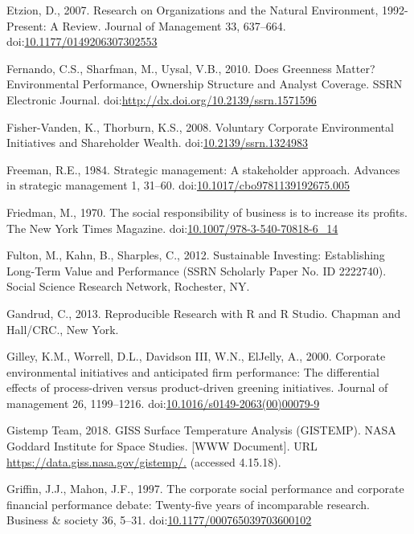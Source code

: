 \documentclass[12pt,]{article}
\begin{document}
\hypertarget{ref-Etzion2007}{}
Etzion, D., 2007. Research on Organizations and the Natural Environment,
1992-Present: A Review. Journal of Management 33, 637--664.
doi:\href{https://doi.org/10.1177/0149206307302553}{10.1177/0149206307302553}

\hypertarget{ref-Fernando2010}{}
Fernando, C.S., Sharfman, M., Uysal, V.B., 2010. Does Greenness Matter?
Environmental Performance, Ownership Structure and Analyst Coverage.
SSRN Electronic Journal.
doi:\href{https://doi.org/http://dx.doi.org/10.2139/ssrn.1571596}{http://dx.doi.org/10.2139/ssrn.1571596}

\hypertarget{ref-Fisher-Vanden2008}{}
Fisher-Vanden, K., Thorburn, K.S., 2008. Voluntary Corporate
Environmental Initiatives and Shareholder Wealth.
doi:\href{https://doi.org/10.2139/ssrn.1324983}{10.2139/ssrn.1324983}

\hypertarget{ref-Freeman1984}{}
Freeman, R.E., 1984. Strategic management: A stakeholder approach.
Advances in strategic management 1, 31--60.
doi:\href{https://doi.org/10.1017/cbo9781139192675.005}{10.1017/cbo9781139192675.005}

\hypertarget{ref-MiltonFriedman1970}{}
Friedman, M., 1970. The social responsibility of business is to increase
its profits. The New York Times Magazine.
doi:\href{https://doi.org/10.1007/978-3-540-70818-6_14}{10.1007/978-3-540-70818-6\_14}

\hypertarget{ref-Fulton2012}{}
Fulton, M., Kahn, B., Sharples, C., 2012. Sustainable Investing:
Establishing Long-Term Value and Performance (SSRN Scholarly Paper No.
ID 2222740). Social Science Research Network, Rochester, NY.

\hypertarget{ref-Gandrud2013b}{}
Gandrud, C., 2013. Reproducible Research with R and R Studio. Chapman
and Hall/CRC., New York.

\hypertarget{ref-Gilley2000}{}
Gilley, K.M., Worrell, D.L., Davidson III, W.N., El\textendash{}Jelly,
A., 2000. Corporate environmental initiatives and anticipated firm
performance: The differential effects of process-driven versus
product-driven greening initiatives. Journal of management 26,
1199--1216.
doi:\href{https://doi.org/10.1016/s0149-2063(00)00079-9}{10.1016/s0149-2063(00)00079-9}

\hypertarget{ref-GistempTeam2018}{}
Gistemp Team, 2018. GISS Surface Temperature Analysis (GISTEMP). NASA
Goddard Institute for Space Studies. {[}WWW Document{]}. URL
\url{https://data.giss.nasa.gov/gistemp/.} (accessed 4.15.18).

\hypertarget{ref-Griffin1997}{}
Griffin, J.J., Mahon, J.F., 1997. The corporate social performance and
corporate financial performance debate: Twenty-five years of
incomparable research. Business \& society 36, 5--31.
doi:\href{https://doi.org/10.1177/000765039703600102}{10.1177/000765039703600102}
\end{document}
